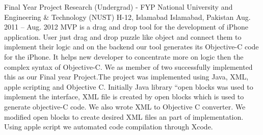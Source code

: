 \begin{cventries}
  \cventry
    {Final Year Project Research (Undergrad) - FYP} %
    {National University and Engineering \& Technology (NUST) H-12, Islamabad} %
    {Islamabad, Pakistan} %
    {Aug. 2011 – Aug. 2012} %
    {
		MVP is a drag and drop tool for the development of iPhone application.
		User just drag and drop puzzle like object and connect them to implement their logic and on the backend
		our tool generates its Objective-C code for the iPhone.
		It helps new developer to concentrate more on logic then the complex syntax of Objective-C.
		We as member of two successfully implemented this as our Final year Project.The project was implemented using 
		Java, XML, apple scripting and Objective C. Initially Java library “open blocks was used to implement the interface,
		XML file is created by open blocks which is used to generate objective-C code. We also wrote XML to Objective C converter.
		We modified open blocks to create desired XML files an part of implementation. Using apple script we automated
		code compilation through Xcode.
    }

\end{cventries}
